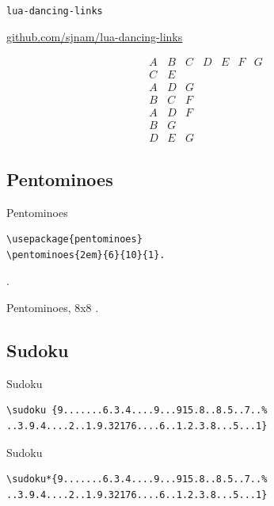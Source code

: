\documentclass[xcolor=svgnames]{beamer}
\begin{document}
%
\begin{frame}{\texttt{lua-dancing-links}}
\begin{center}
  \href{https://github.com/sjnam/lua-dancing-links}
       {github.com/sjnam/lua-dancing-links}
\end{center}
  $$
  \begin{array}{ccccccc}
    A & B & C & D & E & F & G\\
    C & E &&&&&\\
    A & D & G &&&&\\
    B & C & F &&&&\\
    A & D & F &&&&\\
    B & G &&&&&\\
    D & E & G &&&&
  \end{array}
  $$
\end{frame}


\subsection{Pentominoes}

%
\begin{frame}[fragile]{Pentominoes}
\begin{verbatim}
\usepackage{pentominoes}
\pentominoes{2em}{6}{10}{1}.
\end{verbatim}  

.

\end{frame}

%
\begin{frame}{Pentominoes, 8x8}
.
\end{frame}


\subsection{Sudoku}

%
\begin{frame}[fragile]{Sudoku}
\begin{verbatim}
\sudoku {9.......6.3.4....9...915.8..8.5..7..%
..3.9.4....2..1.9.32176....6..1.2.3.8...5...1}
\end{verbatim}  
\begin{center}
\end{center}
\end{frame}

%
\begin{frame}[fragile]{Sudoku}
\begin{verbatim}
\sudoku*{9.......6.3.4....9...915.8..8.5..7..%
..3.9.4....2..1.9.32176....6..1.2.3.8...5...1}
\end{verbatim}
\begin{center}
\end{center}
\end{frame}
\end{document}
